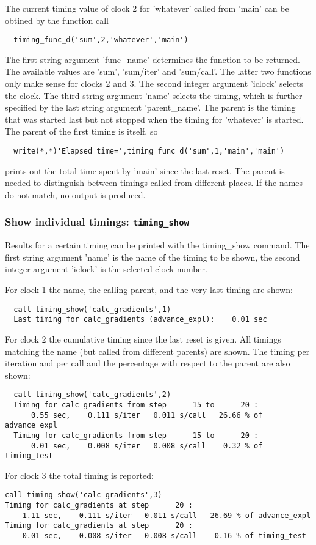 The current timing value of clock 2 for 'whatever' called from 'main'
can be obtined by the function call
\begin{verbatim}
  timing_func_d('sum',2,'whatever','main')
\end{verbatim}
The first string argument 'func\_name' determines the function
to be returned. The available values are 'sum', 'sum/iter' and 'sum/call'.
The latter two functions only make sense for clocks 2 and 3.
The second integer argument 'iclock' selects the clock.
The third string argument 'name' selects the timing,
which is further specified by the last string argument 'parent\_name'.
The parent is the timing that was started last but not stopped when
the timing for 'whatever' is started. The parent of the first timing
is itself, so
\begin{verbatim}
  write(*,*)'Elapsed time=',timing_func_d('sum',1,'main','main')
\end{verbatim}
prints out the total time spent by 'main' since the last reset. 
The parent is needed to distinguish between timings called from 
different places. If the names do not match, no output is produced.

\subsubsection{Show individual timings: {\tt timing\_show}}

Results for a certain timing can be printed with the timing\_show command.
The first string argument 'name' is the name of the timing to be shown, 
the second integer argument 'iclock' is the selected clock number.

For clock 1 the name, the calling parent, and the very last timing are shown:
\begin{verbatim}
  call timing_show('calc_gradients',1)
  Last timing for calc_gradients (advance_expl):    0.01 sec
\end{verbatim}
For clock 2 the cumulative timing since the last reset is given.
All timings matching the name (but called from different parents) are shown.
The timing per iteration and per call and the percentage
with respect to the parent are also shown:
{\small
\begin{verbatim}
  call timing_show('calc_gradients',2)
  Timing for calc_gradients from step      15 to      20 :
      0.55 sec,    0.111 s/iter   0.011 s/call   26.66 % of advance_expl
  Timing for calc_gradients from step      15 to      20 :
      0.01 sec,    0.008 s/iter   0.008 s/call    0.32 % of timing_test
\end{verbatim}
}
For clock 3 the total timing is reported:
{\small
\begin{verbatim}
call timing_show('calc_gradients',3)
Timing for calc_gradients at step      20 :
    1.11 sec,    0.111 s/iter   0.011 s/call   26.69 % of advance_expl
Timing for calc_gradients at step      20 :
    0.01 sec,    0.008 s/iter   0.008 s/call    0.16 % of timing_test
\end{verbatim}
}


